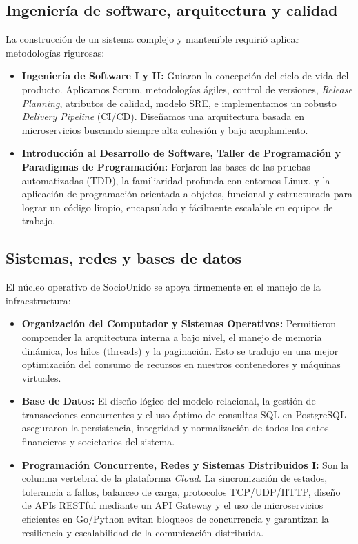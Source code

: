 \newpage

\subsection{Ingeniería de software, arquitectura y calidad}

La construcción de un sistema complejo y mantenible requirió aplicar metodologías rigurosas:

\begin{itemize}
\item \textbf{Ingeniería de Software I y II:} Guiaron la concepción del ciclo de vida del producto. Aplicamos Scrum, metodologías ágiles, control de versiones, \textit{Release Planning}, atributos de calidad, modelo SRE, e implementamos un robusto \textit{Delivery Pipeline} (CI/CD). Diseñamos una arquitectura basada en microservicios buscando siempre alta cohesión y bajo acoplamiento.
\item \textbf{Introducción al Desarrollo de Software, Taller de Programación y Paradigmas de Programación:} Forjaron las bases de las pruebas automatizadas (TDD), la familiaridad profunda con entornos Linux, y la aplicación de programación orientada a objetos, funcional y estructurada para lograr un código limpio, encapsulado y fácilmente escalable en equipos de trabajo.
\end{itemize}

\subsection{Sistemas, redes y bases de datos}

El núcleo operativo de SocioUnido se apoya firmemente en el manejo de la infraestructura:
\begin{itemize}
\item \textbf{Organización del Computador y Sistemas Operativos:} Permitieron comprender la arquitectura interna a bajo nivel, el manejo de memoria dinámica, los hilos (threads) y la paginación. Esto se tradujo en una mejor optimización del consumo de recursos en nuestros contenedores y máquinas virtuales.
\item \textbf{Base de Datos:} El diseño lógico del modelo relacional, la gestión de transacciones concurrentes y el uso óptimo de consultas SQL en PostgreSQL aseguraron la persistencia, integridad y normalización de todos los datos financieros y societarios del sistema.
\item \textbf{Programación Concurrente, Redes y Sistemas Distribuidos I:} Son la columna vertebral de la plataforma \textit{Cloud}. La sincronización de estados, tolerancia a fallos, balanceo de carga, protocolos TCP/UDP/HTTP, diseño de APIs RESTful mediante un API Gateway y el uso de microservicios eficientes en Go/Python evitan bloqueos de concurrencia y garantizan la resiliencia y escalabilidad de la comunicación distribuida.
\end{itemize}

